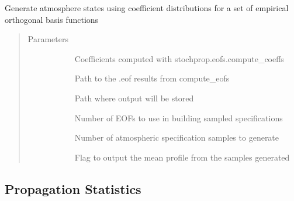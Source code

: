 \documentclass[letterpaper,10pt,english]{sphinxmanual}
\begin{document}
\begin{fulllineitems}
\label{\detokenize{stochprop.eofs:stochprop.eofs.sample_atmo}}
Generate atmosphere states using coefficient distributions for
a set of empirical orthogonal basis functions
\begin{quote}\begin{description}
\item[{Parameters}] \leavevmode\begin{description}
\item[{}] \leavevmode
Coefficients computed with stochprop.eofs.compute\_coeffs

\item[{}] \leavevmode
Path to the .eof results from compute\_eofs

\item[{}] \leavevmode
Path where output will be stored

\item[{}] \leavevmode
Number of EOFs to use in building sampled specifications

\item[{}] \leavevmode
Number of atmospheric specification samples to generate

\item[{}] \leavevmode
Flag to output the mean profile from the samples generated

\end{description}

\end{description}\end{quote}

\end{fulllineitems}



\subsection{Propagation Statistics}
\label{\detokenize{stochprop.propagation:module-stochprop.propagation}}\label{\detokenize{stochprop.propagation:propagation-statistics}}\label{\detokenize{stochprop.propagation::doc}}
\end{document}
